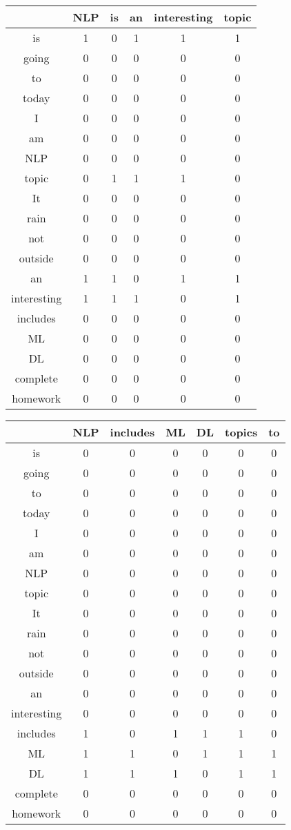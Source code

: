 \begin{center}
\begin{tabular}{||c|| c c c c c||}
\hline
	&NLP& is& an& interesting& topic\\
\hline
	is&1&0&1&1&1\\
going&0&0&0&0&0\\
to&0&0&0&0&0\\
	today&0&0&0&0&0\\
I&0&0&0&0&0\\
am&0&0&0&0&0\\
NLP&0&0&0&0&0\\
topic&0&1&1&1&0\\
It&0&0&0&0&0\\
rain&0&0&0&0&0\\
not&0&0&0&0&0\\
outside&0&0&0&0&0\\
an&1&1&0&1&1\\
interesting&1&1&1&0&1\\
includes&0&0&0&0&0\\
ML&0&0&0&0&0\\
DL&0&0&0&0&0\\
complete&0&0&0&0&0\\
homework&0&0&0&0&0\\
\hline
\end{tabular}

\begin{tabular}{||c|| c c c c c c||}
\hline
&NLP& includes& ML& DL& topics& to\\
\hline
is&0&0&0&0&0&0\\
going&0&0&0&0&0&0\\
to&0&0&0&0&0&0\\
today&0&0&0&0&0&0\\
I&0&0&0&0&0&0\\
am&0&0&0&0&0&0\\
NLP&0&0&0&0&0&0\\
topic&0&0&0&0&0&0\\
It&0&0&0&0&0&0\\
rain&0&0&0&0&0&0\\
not&0&0&0&0&0&0\\
outside&0&0&0&0&0&0\\
an&0&0&0&0&0&0\\
interesting&0&0&0&0&0&0\\
includes&1&0&1&1&1&0\\
ML&1&1&0&1&1&1\\
DL&1&1&1&0&1&1\\
complete&0&0&0&0&0&0\\
homework&0&0&0&0&0&0\\
\hline
\end{tabular}


\end{center}
